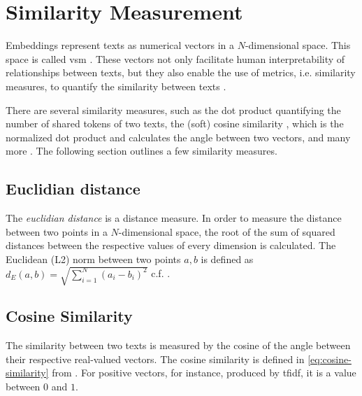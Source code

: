
\section{Similarity Measurement}\label{sec:similarity-measurement}

Embeddings represent texts as numerical vectors in a $N$-dimensional space.
This space is called \ac{vsm} \cite{soft_cosine2014}.
These vectors not only facilitate human interpretability of relationships between texts, 
but they also enable the use of metrics, i.e. similarity measures, to quantify the similarity between texts \cite{IR2011, euclidean_l2_norm2015}.

There are several similarity measures, such as the dot product quantifying the number of shared tokens of two texts, 
the (soft) cosine similarity \cite{soft_cosine2014, soft_cosine2017}, which is the normalized dot product and calculates the angle between two vectors, 
and many more \cite{IR2011, euclidean_l2_norm2015, HfsentTrans2019}.
The following section outlines a few similarity measures.


\subsection{Euclidian distance}\label{subsec:euclidian-distance}

The \textit{euclidian distance} is a distance measure.
In order to measure the distance between two points in a $N$-dimensional space, 
the root of the sum of squared distances between the respective values of every dimension is calculated.
The Euclidean (L2) norm between two points $a, b$ is defined as $d_E(a,b) = \sqrt{\sum_{i=1}^{N}(a_i - b_i)^2}$ c.f. \cite{euclidean_l2_norm2015}.


\subsection{Cosine Similarity}\label{subsec:cosine-similarity}


The similarity between two texts is measured by the cosine of the angle between their respective real-valued vectors.
The cosine similarity is defined in \autoref{eq:cosine-similarity} from \cite{soft_cosine2014}.
For positive vectors, for instance, produced by \ac{tfidf}, it is a value between $0$ and $1$.

